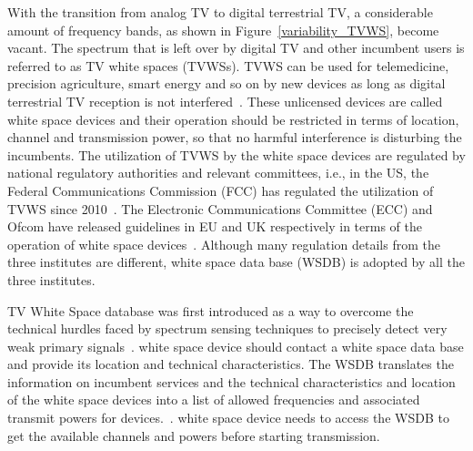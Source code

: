 \documentclass[times]{ettauth}
\newcommand{\ie}{i.e., }
\theoremstyle{mytheoremstyle}
\theoremstyle{mytheoremstyle}
\theoremstyle{mytheoremstyle}
\begin{document}
With the transition from analog TV to digital terrestrial TV, a considerable amount of frequency bands, as shown in Figure~\ref{variability_TVWS}, become vacant.
The spectrum that is left over by digital TV and other incumbent users is referred to as TV white spaces (TVWSs).
TVWS can be used for telemedicine, precision agriculture, smart energy and so on by new devices as long as digital terrestrial TV reception is not interfered~\cite{FCC_2010_sedond_memorandumm}. 
These unlicensed devices are called white space devices and their operation should be restricted in terms of location, channel and transmission power, so that no harmful interference is disturbing the incumbents.
The utilization of TVWS by the white space devices are regulated by national regulatory authorities and relevant committees, \ie in the US, the Federal Communications Commission (FCC) has regulated the utilization of TVWS since 2010~\cite{FCC_2010_sedond_memorandumm}. 
The Electronic Communications Committee (ECC) and Ofcom have released guidelines in EU and UK respectively in terms of the operation of white space devices~\cite{ECC236, ofcom15}.
Although many regulation details from the three institutes are different, white space data base (WSDB) is adopted by all the three institutes.

TV White Space database was first introduced as a way to overcome the technical hurdles faced by spectrum sensing techniques to precisely detect very weak primary signals~\cite{Mwangoka2011DySPAN}.
white space device should contact a white space data base and provide its location and technical characteristics.
The WSDB translates the information on incumbent services and the technical characteristics and location of the white space devices into a list of allowed frequencies and associated transmit powers for devices.~\cite{ECC236}.
white space device needs to access the WSDB to get the available channels and powers before starting transmission.
\end{document}
